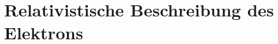 \chapter{Relativistische Beschreibung des Elektrons}


\label{chap:relativistisches_elektron}






